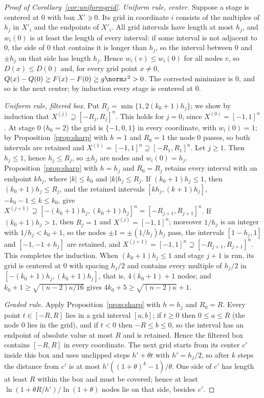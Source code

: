 \begin{proof}[Proof of Corollary~\ref{cor:uniformgrid}]
\emph{Uniform rule, center.} Suppose a stage is centered at $0$ with box
$X'\ni0$. Its grid in coordinate $i$ consists of the multiples of $h_j$ in
$X'_i$ and the endpoints of $X'_i$. All grid intervals have length at most
$h_j$, and $w_i(0)$ is at least the length of every interval: if some
interval is not adjacent to $0$, the side of $0$ that contains it is longer
than $h_j$, so the interval between $0$ and $\pm h_j$ on that side has length
$h_j$. Hence $w_i(v)\le w_i(0)$ for all nodes $v$, so $D(x)\le D(0)$ and, for
every grid point $x\ne0$, $Q(x)-Q(0)\ge F(x)-F(0)\ge g\norm x^2>0$. The
corrected minimizer is $0$, and so is the next center; by induction every
stage is centered at $0$.

\emph{Uniform rule, filtered box.} Put $R_j=\min\{1,2(k_0+1)h_j\}$; we show
by induction that $X^{(j)}\supseteq[-R_j,R_j]^n$. This holds for $j=0$,
since $X^{(0)}=[-1,1]^n$. At stage $0$ ($h_0=2$) the grid is $\{-1,0,1\}$ in
every coordinate, with $w_i(0)=1$; by Proposition~\ref{prop:sharp} with $h=1$
and $R_0=1$ the node $0$ passes, so both intervals are retained and
$X^{(1)}=[-1,1]^n\supseteq[-R_1,R_1]^n$. Let $j\ge1$. Then $h_j\le1$,
hence $h_j\le R_j$, so $\pm h_j$ are nodes and $w_i(0)=h_j$.
Proposition~\ref{prop:sharp} with $h=h_j$ and $R_0=R_j$ retains every
interval with an endpoint $kh_j$, where $|k|\le k_0$ and $|k|h_j\le R_j$. If
$(k_0+1)h_j\le1$, then $(k_0+1)h_j\le R_j$, and the retained intervals
$[kh_j,(k+1)h_j]$, $-k_0-1\le k\le k_0$, give
$X^{(j+1)}\supseteq[-(k_0+1)h_j,(k_0+1)h_j]^n=[-R_{j+1},R_{j+1}]^n$. If
$(k_0+1)h_j>1$, then $R_j=1$ and $X^{(j)}=[-1,1]^n$; moreover $1/h_j$ is an
integer with $1/h_j<k_0+1$, so the nodes $\pm1=\pm(1/h_j)h_j$ pass, the
intervals $[1-h_j,1]$ and $[-1,-1+h_j]$ are retained, and
$X^{(j+1)}=[-1,1]^n\supseteq[-R_{j+1},R_{j+1}]^n$. This completes the
induction. When $(k_0+1)h_j\le1$ and stage $j+1$ is run, its grid is
centered at $0$ with spacing $h_j/2$ and contains every multiple of $h_j/2$ in
$[-(k_0+1)h_j,(k_0+1)h_j]$, that is, $4(k_0+1)+1$ nodes; and
$k_0+1\ge\sqrt{(n-2)\kappa/16}$ gives $4k_0+5\ge\sqrt{(n-2)\kappa}+1$.

\emph{Graded rule.} Apply Proposition~\ref{prop:sharp} with $h=h_j$ and
$R_0=R$. Every point $t\in[-R,R]$ lies in a grid interval $[a,b]$; if
$t\ge0$ then $0\le a\le R$ (the node $0$ lies in the grid), and if $t<0$ then
$-R\le b\le0$, so the interval has an endpoint of absolute value at most $R$
and is retained. Hence the filtered box contains $[-R,R]$ in every
coordinate. The next grid starts from its center $c'$ inside this box and
uses unclipped steps $h'+\theta t$ with $h'=h_j/2$, so after $k$ steps the
distance from $c'$ is at most $h'((1+\theta)^k-1)/\theta$. One side of $c'$
has length at least $R$ within the box and must be covered; hence at least
$\ln(1+\theta R/h')/\ln(1+\theta)$ nodes lie on that side, besides $c'$.
\end{proof}

